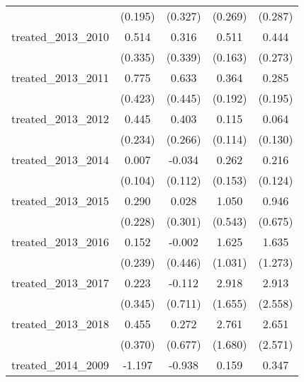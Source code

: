 {\begin{tabular}{l*{4}{c}}
            &     (0.195)         &     (0.327)         &     (0.269)         &     (0.287)         \\
[1em]
treated\_2013\_2010&       0.514         &       0.316         &       0.511\sym{**} &       0.444         \\
            &     (0.335)         &     (0.339)         &     (0.163)         &     (0.273)         \\
[1em]
treated\_2013\_2011&       0.775         &       0.633         &       0.364         &       0.285         \\
            &     (0.423)         &     (0.445)         &     (0.192)         &     (0.195)         \\
[1em]
treated\_2013\_2012&       0.445         &       0.403         &       0.115         &       0.064         \\
            &     (0.234)         &     (0.266)         &     (0.114)         &     (0.130)         \\
[1em]
treated\_2013\_2014&       0.007         &      -0.034         &       0.262         &       0.216         \\
            &     (0.104)         &     (0.112)         &     (0.153)         &     (0.124)         \\
[1em]
treated\_2013\_2015&       0.290         &       0.028         &       1.050         &       0.946         \\
            &     (0.228)         &     (0.301)         &     (0.543)         &     (0.675)         \\
[1em]
treated\_2013\_2016&       0.152         &      -0.002         &       1.625         &       1.635         \\
            &     (0.239)         &     (0.446)         &     (1.031)         &     (1.273)         \\
[1em]
treated\_2013\_2017&       0.223         &      -0.112         &       2.918         &       2.913         \\
            &     (0.345)         &     (0.711)         &     (1.655)         &     (2.558)         \\
[1em]
treated\_2013\_2018&       0.455         &       0.272         &       2.761         &       2.651         \\
            &     (0.370)         &     (0.677)         &     (1.680)         &     (2.571)         \\
[1em]
treated\_2014\_2009&      -1.197         &      -0.938         &       0.159         &       0.347         \\

\end{tabular}}
